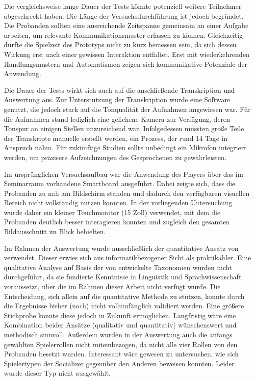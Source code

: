 Die vergleichsweise lange Dauer der Tests könnte potenziell weitere Teilnehmer abgeschreckt haben. Die Länge der Versuchsdurchführung ist jedoch begründet. Die Probanden sollten eine ausreichende Zeitspanne gemeinsam an einer Aufgabe arbeiten, um relevante Kommunikationsmuster erfassen zu können. Gleichzeitig durfte die Spielzeit des Prototyps nicht zu kurz bemessen sein, da sich dessen Wirkung erst nach einer gewissen Interaktion entfaltet. Erst mit wiederkehrenden Handlungsmustern und Automatismen zeigen sich kommunikative Potenziale der Anwendung.

Die Dauer der Tests wirkt sich auch auf die anschließende Transkription und Auswertung aus. Zur Unterstützung der Transkription wurde eine Software genutzt, die jedoch stark auf die Tonqualität der Aufnahmen angewiesen war. Für die Aufnahmen stand lediglich eine geliehene Kamera zur Verfügung, deren Tonspur an einigen Stellen unzureichend war. Infolgedessen mussten große Teile der Transkripte manuelle erstellt werden, ein Prozess, der rund 14 Tage in Anspruch nahm. Für zukünftige Studien sollte unbedingt ein Mikrofon integriert werden, um präzisere Aufzeichnungen des Gesprochenen zu gewährleisten. 

Im ursprünglichen Versuchsaufbau war die Anwendung des Players über das im Seminarraum vorhandene Smartboard ausgeführt. Dabei zeigte sich, dass die Probanden zu nah am Bildschirm standen und dadurch den verfügbaren visuellen Bereich nicht vollständig nutzen konnten. In der vorliegenden Untersuchung wurde daher ein kleiner Touchmonitor (15 Zoll) verwendet, mit dem die Probanden deutlich besser interagieren konnten und zugleich den gesamten Bildausschnitt im Blick behielten.

Im Rahmen der Auswertung wurde ausschließlich der quantitative Ansatz von \cite{nasir_effect_2015} verwendet. Dieser erwies sich aus informatikbezogener Sicht als praktikabler. Eine qualitative Analyse auf Basis der von \cite{baykal_collaboration_2023} entwickelte Taxonomien wurden nicht durchgeführt, da sie fundierte Kenntnisse in Linguistik und Sprachwissenschaft voraussetzt, über die im Rahmen dieser Arbeit nicht verfügt wurde. Die Entscheidung, sich allein auf die quantitative Methode zu stützen, konnte durch die Ergebnisse bisher (noch) nicht vollumfänglich validiert werden. Eine größere Stichprobe könnte diese jedoch in Zukunft ermöglichen. Langfristig wäre eine Kombination beider Ansätze (qualitativ und quantitativ) wünschenswert und methodisch sinnvoll. Außerdem wurden in der Auswertung auch die anfangs gewählten Spielerrollen nicht miteinbezogen, da nicht alle vier Rollen von den Probanden besetzt wurden. Interessant wäre gewesen zu untersuchen, wie sich Spielertypen der Socializer gegenüber den Anderen beweisen konnten. Leider wurde dieser Typ nicht ausgewählt.